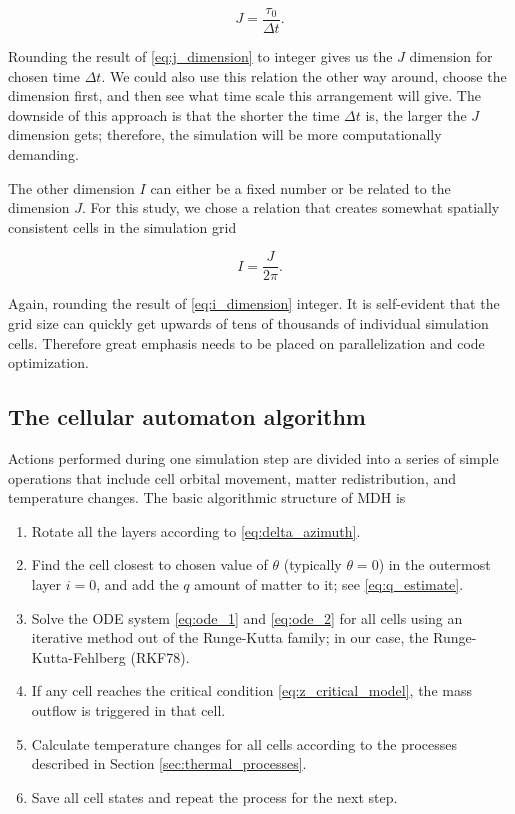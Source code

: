 \begin{equation}
	J = \frac{\tau_{0}}{\Delta t}.
	\label{eq:j_dimension}
\end{equation}

Rounding the result of \eqref{eq:j_dimension} to integer gives us the $J$ dimension for chosen time $\Delta t$. We could also use this relation the other way around, choose the dimension first, and then see what time scale this arrangement will give. The downside of this approach is that the shorter the time $\Delta t$ is, the larger the $J$ dimension gets; therefore, the simulation will be more computationally demanding.

The other dimension $I$ can either be a fixed number or be related to the dimension $J$. For this study, we chose a relation that creates somewhat spatially consistent cells in the simulation grid

\begin{equation}
	I = \frac{J}{2 \pi}.
	\label{eq:i_dimension} 
\end{equation}

Again, rounding the result of \eqref{eq:i_dimension} integer. It is self-evident that the grid size can quickly get upwards of tens of thousands of individual simulation cells. Therefore great emphasis needs to be placed on parallelization and code optimization. 

\subsection{The cellular automaton algorithm}

Actions performed during one simulation step are divided into a series of simple operations that include cell orbital movement, matter redistribution, and temperature changes. The basic algorithmic structure of MDH is

\begin{enumerate}
	\item Rotate all the layers according to \eqref{eq:delta_azimuth}.
	\item Find the cell closest to chosen value of $\theta$ (typically $\theta = 0$) in the outermost layer $i = 0$, and add the $q$ amount of matter to it; see \eqref{eq:q_estimate}.
	\item Solve the ODE system \eqref{eq:ode_1} and \eqref{eq:ode_2} for all cells using an iterative method out of the Runge-Kutta family; in our case, the Runge-Kutta-Fehlberg (RKF78).
	\item If any cell reaches the critical condition \eqref{eq:z_critical_model}, the mass outflow is triggered in that cell.
    \item Calculate temperature changes for all cells according to the processes described in Section \ref{sec:thermal_processes}.
	\item Save all cell states and repeat the process for the next step.
\end{enumerate}

